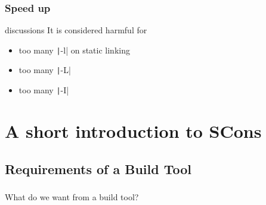 \documentclass[lualatex]{beamer}
\begin{document}
\begin{frame}[fragile]
  \frametitle{Speed up}

  \begin{block}{discussions}
    It is considered harmful for
    \begin{itemize}
    \item too many \texttt|-l| on static linking
    \item too many \texttt|-L|
    \item too many \texttt|-I|
    \end{itemize}
  \end{block}
\end{frame}

\section{A short introduction to SCons}

\subsection{Requirements of a Build Tool}

\begin{frame}
  \frametitle{}

  \begin{center}
    \Large
    What do we want from a build tool?
  \end{center}
\end{frame}
\end{document}
